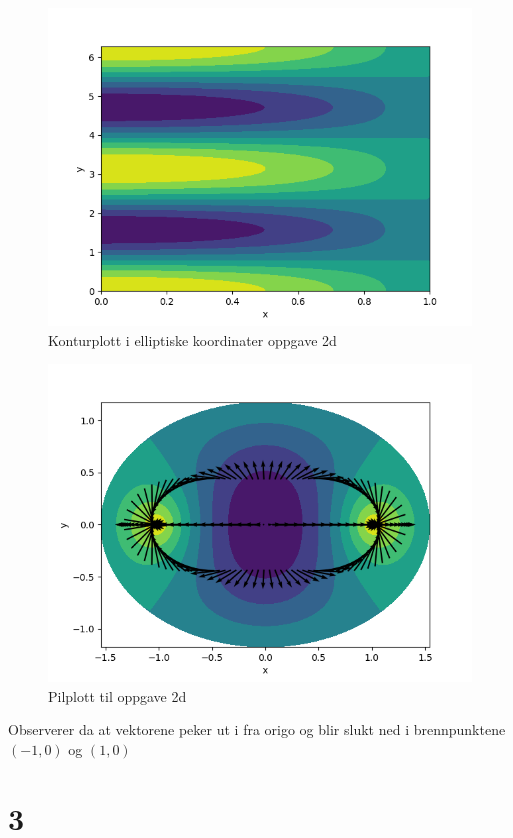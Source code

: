 \documentclass[a4paper,10pt,norsk]{article}
\begin{document}
	\begin{figure}[h!]
		\centering
		\caption{Konturplott i elliptiske koordinater oppgave 2d}
		\label{fig:2d_elliptical}
		\includegraphics{2d_elliptical.png}
	\end{figure}
	
		\begin{figure}[h!]
			\centering
			\caption{Pilplott til oppgave 2d}
			\label{fig:2d}
			\includegraphics{2d.png}
		\end{figure}
		Observerer da at vektorene peker ut i fra origo og blir slukt ned i brennpunktene $(-1, 0)$ og $(1,0)$
		\newpage
	

\section*{3}
\end{document}
